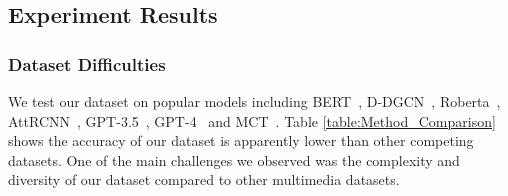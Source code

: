 \subsection{Experiment Results}
\subsubsection{Dataset Difficulties}
We test our dataset on popular models including BERT~\citep{devlin2019bert}, D-DGCN~\citep{yang2023orders}, Roberta~\citep{liu2019roberta}, AttRCNN~\citep{article1}, GPT-3.5~\citep{openai2023gpt35}, GPT-4~\citep{GPT-4-0125} and MCT~\citep{10386376}. Table \ref{table:Method_Comparison} shows the accuracy of our dataset is apparently lower than other competing datasets. One of the main challenges we observed was the complexity and diversity of our dataset compared to other multimedia datasets. 


